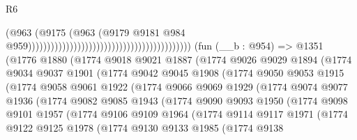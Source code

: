 \begin{lexlean}{R6}
\begin{coremodule}
                                                                                  (@963
                                                                                    (@9175
                                                                                      (@963
                                                                                        (@9179
                                                                                          @9181
                                                                                          @984
                                                                                          @959)))))))))))))))))))))))))))))))))))))))))))
    (fun (__b : @954) =>
    @1351
      (@1776
        @1880
        (@1774
          @9018
          @9021
          @1887
          (@1774
            @9026
            @9029
            @1894
            (@1774
              @9034
              @9037
              @1901
              (@1774
                @9042
                @9045
                @1908
                (@1774
                  @9050
                  @9053
                  @1915
                  (@1774
                    @9058
                    @9061
                    @1922
                    (@1774
                      @9066
                      @9069
                      @1929
                      (@1774
                        @9074
                        @9077
                        @1936
                        (@1774
                          @9082
                          @9085
                          @1943
                          (@1774
                            @9090
                            @9093
                            @1950
                            (@1774
                              @9098
                              @9101
                              @1957
                              (@1774
                                @9106
                                @9109
                                @1964
                                (@1774
                                  @9114
                                  @9117
                                  @1971
                                  (@1774
                                    @9122
                                    @9125
                                    @1978
                                    (@1774
                                      @9130
                                      @9133
                                      @1985
                                      (@1774
                                        @9138

\end{coremodule}
\end{lexlean}
